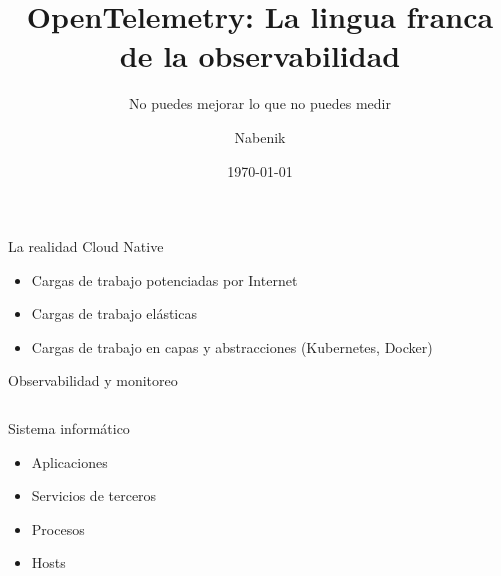 \documentclass[aspectratio=169]{beamer}
\title{OpenTelemetry: La lingua franca de la observabilidad}
\subtitle{No puedes mejorar lo que no puedes medir}
\author{Nabenik}
\date{\today}
\begin{document}
	
	{
		\begin{frame}
			\maketitle
		\end{frame}
	}
	
	\begin{frame}{La realidad Cloud Native}
		
		\begin{itemize}
			\item Cargas de trabajo potenciadas por Internet
			\item Cargas de trabajo elásticas
			\item Cargas de trabajo en capas y abstracciones (Kubernetes, Docker)
		\end{itemize}		
		
	\end{frame}
	
	\begin{frame}{Observabilidad y monitoreo}
		
		\begin{columns}
			
			\begin{column}{0.5\textwidth}
				Sistema informático {\Huge \faServer}
				\begin{itemize}
					\item Aplicaciones
					\item Servicios de terceros
					\item Procesos
					\item Hosts
				\end{itemize}
			\end{column}
			
			\begin{column}{0.5\textwidth}
				{\Huge	 \faBinoculars}
			\end{column}
		\end{columns}
		
	\end{frame}
	
\end{document}
